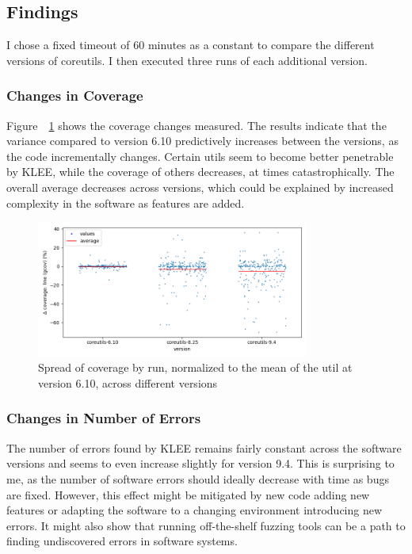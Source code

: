 \documentclass{article}
\let\savedRef=\ref
\renewcommand{\ref}{\unskip~\savedRef}
\begin{document}
\subsection{Findings}

I chose a fixed timeout of 60 minutes as a constant to compare the different versions of coreutils. I then executed three runs of each additional version.

\subsubsection{Changes in Coverage}

Figure~\ref{fig:spread_across_versions_gcov} shows the coverage changes measured. The results indicate that the variance compared to version 6.10 predictively increases between the versions, as the code incrementally changes. Certain utils seem to become better penetrable by KLEE, while the coverage of others decreases, at times catastrophically. The overall average decreases across versions, which could be explained by increased complexity in the software as features are added.

\begin{figure}[ht]
    \centering
    \includegraphics[width=0.8\textwidth]{../plots/gcov_cov/changes-by-version.png}
    \captionsetup{width=0.6\textwidth}
    \caption{Spread of coverage by run, normalized to the mean of the util at version 6.10, across different versions}
    \label{fig:spread_across_versions_gcov}
\end{figure}


\subsubsection{Changes in Number of Errors}

The number of errors found by KLEE remains fairly constant across the software versions and seems to even increase slightly for version 9.4. This is surprising to me, as the number of software errors should ideally decrease with time as bugs are fixed. However, this effect might be mitigated by new code adding new features or adapting the software to a changing environment introducing new errors. It might also show that running off-the-shelf fuzzing tools can be a path to finding undiscovered errors in software systems.
\end{document}
